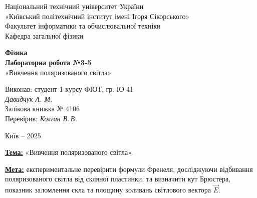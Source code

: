 \documentclass[12pt,a4paper]{article}
\begin{document}
    \begin{titlepage}

        \thispagestyle{empty}
        \begin{center}
        \large
        Національний технічний університет України\\
        «Київський політехнічний інститут імені Ігоря Сікорського»\\[1em]
        Факультет інформатики та обчислювальної техніки\\
        Кафедра загальної фізики
        \end{center}

        \vfill

        \begin{center}
        \textbf{\LARGE Фізика}\\[2em]
        \textbf{\Large Лабораторна робота №3-5}\\
        «Вивчення поляризованого світла» 
        \end{center}

        \vfill

        \begin{flushright}
        Виконав: студент 1 курсу ФІОТ, гр. ІО-41\\
        \textit{Давидчук А. М.}\\
        Залікова книжка № 4106\\[1em]
        Перевірив: \textit{Колган В.\,В.}
        \end{flushright}

        \vfill

        \begin{center}
        Київ -- 2025
        \end{center}

    \end{titlepage}

    \setlength{\parindent}{0pt}

    \textbf{\underline{Тема:}} «Вивчення поляризованого світла».

    \vspace{1em}

    \textbf{\underline{Мета:}} експериментальне перевірити формули Френеля, досліджуючи
    відбивання поляризованого світла від скляної пластинки, та визначити кут
    Брюстера, показник заломлення скла та площину коливань світлового вектора $\vec{E}$.

    \vspace{1.5em}
\end{document}
